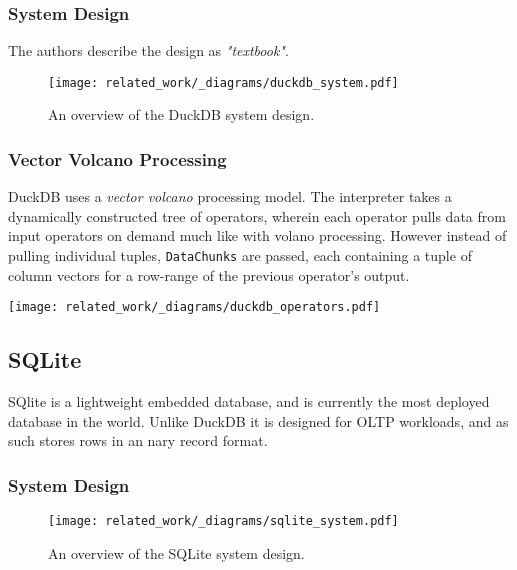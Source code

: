 \subsubsection{System Design}
The authors describe the design as \textit{"textbook"}\cite{DuckDBPaper}.
\begin{figure}[h!]
    \centering
    \texttt{[image: related\_work/\_diagrams/duckdb\_system.pdf]}
    \caption{An overview of the DuckDB system design.}
\end{figure}
\subsubsection{Vector Volcano Processing}
DuckDB uses a \textit{vector volcano} processing model. The interpreter takes a dynamically constructed tree of operators, wherein each operator pulls data from input operators on demand much like with volano processing.
However instead of pulling individual tuples, \texttt{DataChunks} are passed, each containing a tuple of column vectors for a row-range of the previous operator's output.
\begin{center}
    \texttt{[image: related\_work/\_diagrams/duckdb\_operators.pdf]}
\end{center}


\subsection{SQLite}
SQlite is a lightweight embedded database\cite{SQLitePaper}, and is currently the most deployed database in the world\cite{SQLiteWebsite}.
Unlike DuckDB it is designed for OLTP workloads, and as such stores rows in an nary record format.
\subsubsection{System Design}
\begin{figure}[h!]
    \centering
    \texttt{[image: related\_work/\_diagrams/sqlite\_system.pdf]}
    \caption{An overview of the SQLite system design.}
\end{figure}

